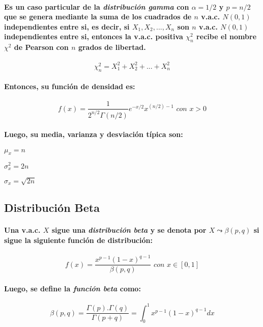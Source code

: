 \paragraph{
Es un caso particular de la \emph{distribución gamma} con $\alpha = 1/2$ y $p = n/2$ que se genera mediante la suma de los cuadrados de $n$ v.a.c. $N(0,1)$ independientes entre si, es decir, si $X_1,X_2,...,X_n$ son $n$ v.a.c. $N(0,1)$ independientes entre si, entonces la v.a.c. positiva $\chi_n^2$ recibe el nombre $\chi^2$ de Pearson con $n$ grados de libertad.
}
\begin{equation}
\chi_n^2 = X_1^2 + X_2^2 + ... + X_n^2
\end{equation}
\paragraph{
Entonces, su función de densidad es:
}
\begin{equation}
f(x)  = \frac{1}{2^{n/2}\Gamma(n/2)} e^{-x/2}x^{(n/2)-1} \textit{ con } x > 0
\end{equation}
\paragraph{
Luego, su media, varianza y desviación típica son:
}
\begin{description}
\item $\mu_x = n$
\item $\sigma_x^2 = 2n$
\item $\sigma_x = \sqrt{2n}$
\end{description}


\subsection{Distribución Beta}
\paragraph{
Una v.a.c. $X$ sigue una \emph{distribución beta} y se denota por $X \leadsto \beta(p,q)$ si sigue la siguiente función de distribución:
}
\begin{equation}
f(x) = \frac{x^{p-1}(1-x)^{q-1}}{\beta(p,q)} \textit{ con } x \in [0,1]
\end{equation}
\paragraph{
Luego, se define la \emph{función beta} como:
}
\begin{equation}
\beta(p,q) = \frac{\Gamma(p).\Gamma(q)}{\Gamma(p+q)} = \int_0^1 x^{p-1} (1-x)^{q-1} dx
\end{equation}


